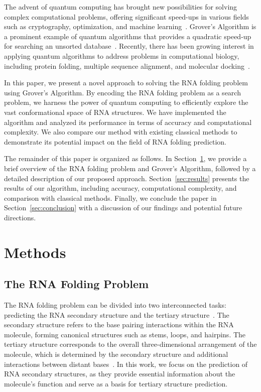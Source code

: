 The advent of quantum computing has brought new possibilities for solving complex computational problems, offering significant speed-ups in various fields such as cryptography, optimization, and machine learning~\cite{shor1999polynomial, grover1996fast, wiebe2014quantum}. Grover's Algorithm is a prominent example of quantum algorithms that provides a quadratic speed-up for searching an unsorted database~\cite{grover1996fast}. Recently, there has been growing interest in applying quantum algorithms to address problems in computational biology, including protein folding, multiple sequence alignment, and molecular docking~\cite{amin2019quantum, fingerhuth2018quantum, bharti2020quantum}.

In this paper, we present a novel approach to solving the RNA folding problem using Grover's Algorithm. By encoding the RNA folding problem as a search problem, we harness the power of quantum computing to efficiently explore the vast conformational space of RNA structures. We have implemented the algorithm and analyzed its performance in terms of accuracy and computational complexity. We also compare our method with existing classical methods to demonstrate its potential impact on the field of RNA folding prediction.

The remainder of this paper is organized as follows. In Section~\ref{sec:methods}, we provide a brief overview of the RNA folding problem and Grover's Algorithm, followed by a detailed description of our proposed approach. Section~\ref{sec:results} presents the results of our algorithm, including accuracy, computational complexity, and comparison with classical methods. Finally, we conclude the paper in Section~\ref{sec:conclusion} with a discussion of our findings and potential future directions.

\section{Methods} \label{sec:methods}

\subsection{The RNA Folding Problem}

The RNA folding problem can be divided into two interconnected tasks: predicting the RNA secondary structure and the tertiary structure~\cite{tinoco1999rna}. The secondary structure refers to the base pairing interactions within the RNA molecule, forming canonical structures such as stems, loops, and hairpins. The tertiary structure corresponds to the overall three-dimensional arrangement of the molecule, which is determined by the secondary structure and additional interactions between distant bases~\cite{holbrook2005rna}. In this work, we focus on the prediction of RNA secondary structures, as they provide essential information about the molecule's function and serve as a basis for tertiary structure prediction.

